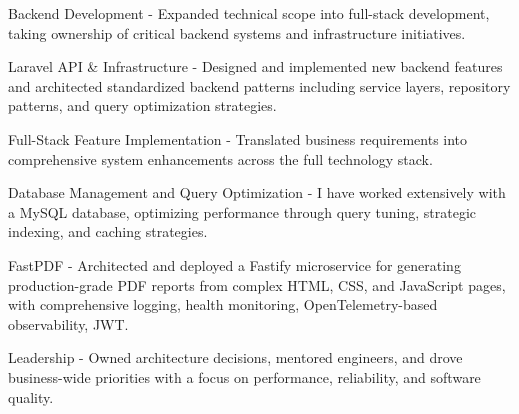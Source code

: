 \begin{cventries}
{\begin{cvsubitems}
        \end{cvsubitems}
        \begin{cvitems} %
            \item {Backend Development - Expanded technical scope into full-stack development, taking ownership of critical backend systems and infrastructure initiatives.}
        \end{cvitems}
        \begin{cvsubitems}
            \item {Laravel API \& Infrastructure - Designed and implemented new backend features and architected standardized backend patterns including service layers, repository patterns, and query optimization strategies.}
            \item {Full-Stack Feature Implementation - Translated business requirements into comprehensive system enhancements across the full technology stack.}
            \item {Database Management and Query Optimization - I have worked extensively with a MySQL database, optimizing performance through query tuning, strategic indexing, and caching strategies.}
            \item {FastPDF - Architected and deployed a Fastify microservice for generating production-grade PDF reports from complex HTML, CSS, and JavaScript pages, with comprehensive logging, health monitoring, OpenTelemetry-based observability, JWT.}
        \end{cvsubitems}
        \begin{cvitems}
            \item {Leadership - Owned architecture decisions, mentored engineers, and drove business-wide priorities with a focus on performance, reliability, and software quality.}
        \end{cvitems}
    }
\end{cventries}
